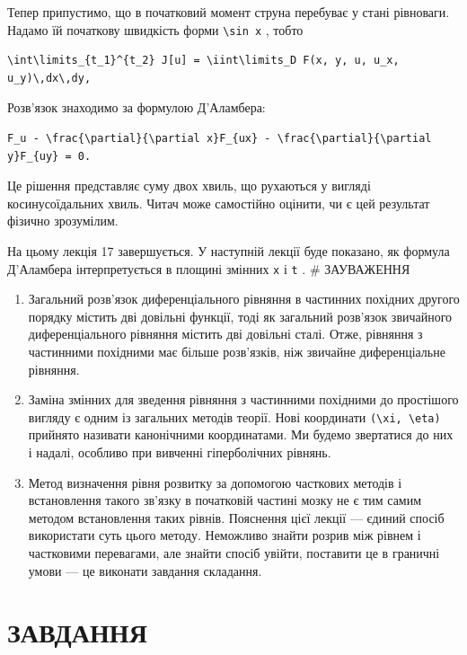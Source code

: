 \documentclass[
  ukrainian,
]{article}
\begin{document}
Тепер припустимо, що в початковий момент струна перебуває у стані
рівноваги. Надамо їй початкову швидкість форми
\texttt{\textbackslash{}sin\ x} , тобто

\begin{verbatim}
\int\limits_{t_1}^{t_2} J[u] = \iint\limits_D F(x, y, u, u_x, u_y)\,dx\,dy,
\end{verbatim}

Розв'язок знаходимо за формулою Д'Аламбера:

\begin{verbatim}
F_u - \frac{\partial}{\partial x}F_{ux} - \frac{\partial}{\partial y}F_{uy} = 0.
\end{verbatim}

Це рішення представляє суму двох хвиль, що рухаються у вигляді
косинусоїдальних хвиль. Читач може самостійно оцінити, чи є цей
результат фізично зрозумілим.

На цьому лекція 17 завершується. У наступній лекції буде показано, як
формула Д'Аламбера інтерпретується в площині змінних \texttt{x} і
\texttt{t} . \# ЗАУВАЖЕННЯ

\begin{enumerate}
\def\labelenumi{\arabic{enumi}.}
\item
  Загальний розв'язок диференціального рівняння в частинних похідних
  другого порядку містить дві довільні функції, тоді як загальний
  розв'язок звичайного диференціального рівняння містить дві довільні
  сталі. Отже, рівняння з частинними похідними має більше розв'язків,
  ніж звичайне диференціальне рівняння.
\item
  Заміна змінних для зведення рівняння з частинними похідними до
  простішого вигляду є одним із загальних методів теорії. Нові
  координати \texttt{(\textbackslash{}xi,\ \textbackslash{}eta)}
  прийнято називати канонічними координатами. Ми будемо звертатися до
  них і надалі, особливо при вивченні гіперболічних рівнянь.
\item
  Метод визначення рівня розвитку за допомогою часткових методів і
  встановлення такого зв'язку в початковій частині мозку не є тим самим
  методом встановлення таких рівнів. Пояснення цієї лекції --- єдиний
  спосіб використати суть цього методу. Неможливо знайти розрив між
  рівнем і частковими перевагами, але знайти спосіб увійти, поставити це
  в граничні умови --- це виконати завдання складання.
\end{enumerate}

\section{ЗАВДАННЯ}\label{ux437ux430ux432ux434ux430ux43dux43dux44f-9}
\end{document}
